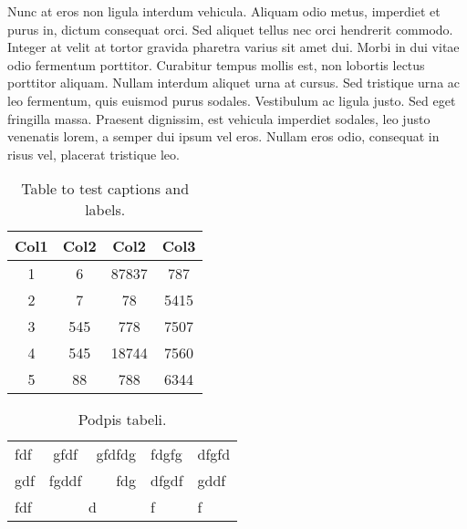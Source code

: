 \documentclass[12pt]{article}
\begin{document}
Nunc at eros non ligula interdum vehicula. Aliquam odio metus, imperdiet et purus in, dictum consequat orci. Sed aliquet tellus nec orci hendrerit commodo. Integer at velit at tortor gravida pharetra varius sit amet dui. Morbi in dui vitae odio fermentum porttitor. Curabitur tempus mollis est, non lobortis lectus porttitor aliquam. Nullam interdum aliquet urna at cursus. Sed tristique urna ac leo fermentum, quis euismod purus sodales. Vestibulum ac ligula justo. Sed eget fringilla massa. Praesent dignissim, est vehicula imperdiet sodales, leo justo venenatis lorem, a semper dui ipsum vel eros. Nullam eros odio, consequat in risus vel, placerat tristique leo.

\listoffigures

\begin{table}[h]
\centering
\begin{tabular}{|c c c c|} 
 \hline
 Col1 & Col2 & Col2 & Col3 \\   \hline 

 1 & 6 & 87837 & 787 \\ 
 2 & 7 & 78 & 5415 \\
 3 & 545 & 778 & 7507 \\
 4 & 545 & 18744 & 7560 \\
 5 & 88 & 788 & 6344 \\  \hline

\end{tabular}
\caption{Table to test captions and labels.}
\label{table:1}
\end{table}

\begin{table}[h]
\centering
\begin{tabular}{lcrll}
\cline{4-5}
fdf & gfdf  & \multicolumn{1}{r|}{gfdfdg} & \multicolumn{1}{l|}{fdgfg} & \multicolumn{1}{l|}{dfgfd} \\ \cline{4-5} 
gdf & fgddf & \multicolumn{1}{r|}{fdg}    & \multicolumn{1}{l|}{dfgdf} & \multicolumn{1}{l|}{gddf}  \\ \cline{4-5} 
fdf & \multicolumn{2}{c}{d}               & f                          & f                         
\end{tabular}
\caption{Podpis tabeli.}
\label{tab:test1}
\end{table}
\end{document}
